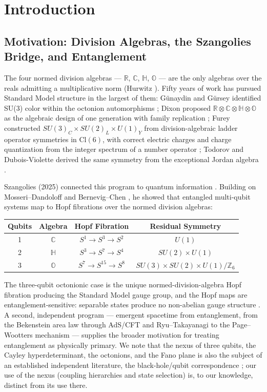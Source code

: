 \documentclass[11pt]{article}
\newcommand{\CC}{\mathbb{C}}
\newcommand{\RR}{\mathbb{R}}
\newcommand{\HH}{\mathbb{H}}
\newcommand{\OO}{\mathbb{O}}
\begin{document}
\section{Introduction}
\label{sec:intro}

\subsection{Motivation: Division Algebras, the Szangolies Bridge, and Entanglement}
\label{sec:motivation}

The four normed division algebras --- $\RR$, $\CC$, $\HH$, $\OO$ --- are the only algebras over the reals admitting a multiplicative norm (Hurwitz \cite{hurwitz}). Fifty years of work has pursued Standard Model structure in the largest of them: G\"unaydin and G\"ursey identified SU(3) color within the octonion automorphisms \cite{gunaydin}; Dixon proposed $\RR \otimes \CC \otimes \HH \otimes \OO$ as the algebraic design of one generation with family replication \cite{dixon94, dixon04}; Furey constructed $SU(3)_C \times SU(2)_L \times U(1)_Y$ from division-algebraic ladder operator symmetries in $\mathrm{Cl}(6)$, with correct electric charges and charge quantization from the integer spectrum of a number operator \cite{furey14, furey18}; Todorov and Dubois-Violette derived the same symmetry from the exceptional Jordan algebra \cite{todorov18, todorov22}.

Szangolies (2025) connected this program to quantum information \cite{szangolies}. Building on Mosseri--Dandoloff \cite{mosseri} and Bernevig--Chen \cite{bernevig}, he showed that entangled multi-qubit systems map to Hopf fibrations over the normed division algebras:

\begin{center}
\begin{tabular}{cccc}
\hline
Qubits & Algebra & Hopf Fibration & Residual Symmetry \\
\hline
1 & $\CC$ & $S^1 \to S^3 \to S^2$ & $U(1)$ \\
2 & $\HH$ & $S^3 \to S^7 \to S^4$ & $SU(2) \times U(1)$ \\
3 & $\OO$ & $S^7 \to S^{15} \to S^8$ & $SU(3) \times SU(2) \times U(1)/\mathbb{Z}_6$ \\
\hline
\end{tabular}
\end{center}

The three-qubit octonionic case is the unique normed-division-algebra Hopf fibration producing the Standard Model gauge group, and the Hopf maps are entanglement-sensitive: separable states produce no non-abelian gauge structure \cite{szangolies}. A second, independent program --- emergent spacetime from entanglement, from the Bekenstein area law through AdS/CFT and Ryu--Takayanagi to the Page--Wootters mechanism \cite{bekenstein, maldacena, ryu, page, takayanagi} --- supplies the broader motivation for treating entanglement as physically primary. We note that the nexus of three qubits, the Cayley hyperdeterminant, the octonions, and the Fano plane is also the subject of an established independent literature, the black-hole/qubit correspondence \cite{borsten}; our use of the nexus (coupling hierarchies and state selection) is, to our knowledge, distinct from its use there.
\end{document}
